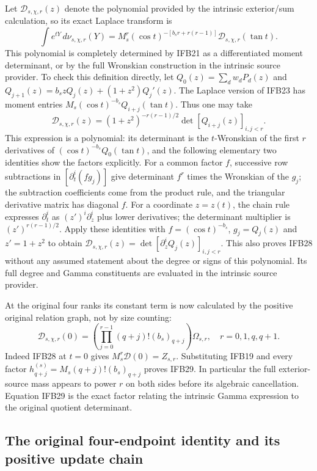 \documentclass[11pt,a4paper]{article}
\begin{document}
Let $\mathcal D_{s,\chi,r}(z)$ denote the polynomial provided by
the intrinsic exterior/sum calculation, so its exact Laplace
transform is
\[
 \int e^{tY}\,d\nu_{s,\chi,r}(Y)
 =M_s^r(\cos t)^{-[b_sr+r(r-1)]}
             \mathcal D_{s,\chi,r}(\tan t).
 \tag{IFB28}
\]
This polynomial is completely determined by IFB21 as a differentiated
moment determinant, or by the full Wronskian construction in the
intrinsic source provider. To check this definition directly, let
$Q_0(z)=\sum_dw_dP_d(z)$ and
$Q_{j+1}(z)=b_szQ_j(z)+(1+z^2)Q_j'(z)$.
The Laplace version of IFB23 has moment entries
$M_s(\cos t)^{-b_s}Q_{i+j}(\tan t)$.
Thus one may take
\[
 \mathcal D_{s,\chi,r}(z)
 =(1+z^2)^{-r(r-1)/2}\det[Q_{i+j}(z)]_{i,j<r}.
\]
This expression is a polynomial: its determinant is the
$t$-Wronskian of the first $r$ derivatives of
$(\cos t)^{-b_s}Q_0(\tan t)$, and the following elementary two
identities show the factors explicitly.
For a common factor $f$, successive row subtractions in
$[\partial_t^i(fg_j)]$ give determinant $f^r$
times the Wronskian of the $g_j$; the subtraction coefficients come
from the product rule, and the triangular derivative matrix has
diagonal $f$. For a coordinate $z=z(t)$, the chain rule expresses
$\partial_t^i$ as $(z')^i\partial_z^i$ plus lower derivatives;
the determinant multiplier is $(z')^{r(r-1)/2}$.
Apply these identities with $f=(\cos t)^{-b_s}$,
$g_j=Q_j(z)$ and $z'=1+z^2$ to obtain
$\mathcal D_{s,\chi,r}(z)=\det[\partial_z^iQ_j(z)]_{i,j<r}$.
This also proves IFB28 without any assumed statement about the
degree or signs of this polynomial. Its full degree and Gamma
constituents are evaluated in the intrinsic source provider.

At the original four ranks its constant term is now calculated by
the positive original relation graph, not by size counting:
\[
 \boxed{\displaystyle
 \mathcal D_{s,\chi,r}(0)
 =\left(\prod_{j=0}^{r-1}(q+j)!(b_s)_{q+j}\right)
                       \Omega_{s,r},\quad r=0,1,q,q+1.}
 \tag{IFB29}
\]
Indeed IFB28 at $t=0$ gives $M_s^r\mathcal D(0)=Z_{s,r}$.
Substituting IFB19 and every factor
$h_{q+j}^{(s)}=M_s(q+j)!(b_s)_{q+j}$ proves IFB29. In particular
the full exterior-source mass appears to power $r$ on both sides
before its algebraic cancellation. Equation IFB29 is the exact
factor relating the intrinsic Gamma expression to the original
quotient determinant.

\subsection{The original four-endpoint identity and its positive update chain}
\end{document}
